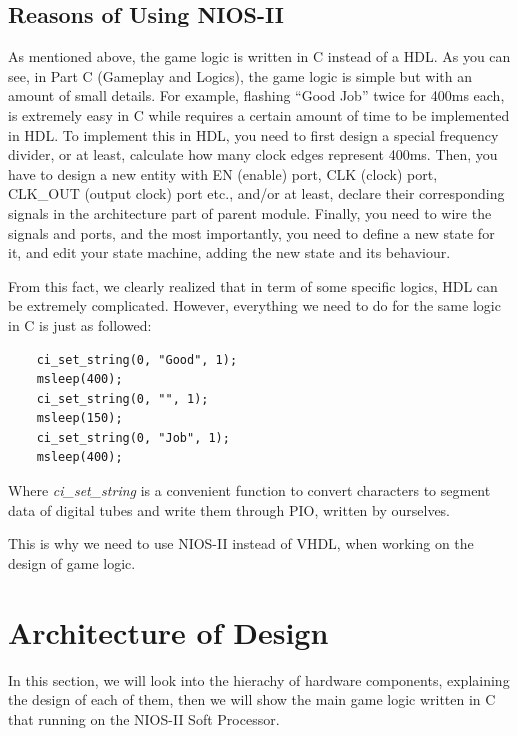 \documentclass[conference]{IEEEtran}
\begin{document}
\subsection{Reasons of Using NIOS-II}
As mentioned above, the game logic is written in C instead of a HDL. As you can see, in Part C (Gameplay and Logics), the game logic is simple but with an amount of small details. For example, flashing ``Good Job'' twice for 400ms each, is extremely easy in C while requires a certain amount of time to be implemented in HDL. To implement this in HDL, you need to first design a special frequency divider, or at least, calculate how many clock edges represent 400ms. Then, you have to design a new entity with EN (enable) port, CLK (clock) port, CLK\_OUT (output clock) port etc., and/or at least, declare their corresponding signals in the architecture part of parent module. Finally, you need to wire the signals and ports, and the most importantly, you need to define a new state for it, and edit your state machine, adding the new state and its behaviour.

From this fact, we clearly realized that in term of some specific logics, HDL can be extremely complicated. However, everything we need to do for the same logic in C is just as followed:
\begin{lstlisting}
    ci_set_string(0, "Good", 1);
    msleep(400);
    ci_set_string(0, "", 1);
    msleep(150);
    ci_set_string(0, "Job", 1);
    msleep(400);
\end{lstlisting}

Where \emph{ci\_set\_string} is a convenient function to convert characters to segment data of digital tubes and write them through PIO, written by ourselves.

This is why we need to use NIOS-II instead of VHDL, when working on the design of game logic.

\section{Architecture of Design}
In this section, we will look into the hierachy of hardware components, explaining the design of each of them, then we will show the main game logic written in C that running on the NIOS-II Soft Processor. 
\end{document}
